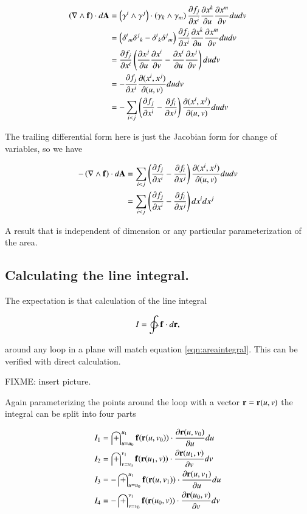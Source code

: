 \documentclass{article}
\newcommand{\grad}[0]{\nabla}
\newcommand{\PD}[2]{\frac{\partial {#2}}{\partial {#1}}}
\begin{document}
\begin{align*}
\left(\grad \wedge \Bf\right) \cdot d\BA
&= \left( \gamma^i \wedge \gamma^j \right) \cdot \left(\gamma_k \wedge \gamma_m \right) \PD{x^{i}}{f_j} \PD{u}{x^k} \PD{v}{x^m} du dv \\
&= \left( {\delta^i}_m {\delta^j}_k -{\delta^i}_k {\delta^j}_m \right) \PD{x^{i}}{f_j} \PD{u}{x^k} \PD{v}{x^m} du dv \\
&= \PD{x^{i}}{f_j} \left( \PD{u}{x^j} \PD{v}{x^i} -\PD{u}{x^i} \PD{v}{x^j} \right) du dv \\
&= -\PD{x^{i}}{f_j} \PD{(u,v)}{(x^i, x^j)} du dv \\
&= -\sum_{i<j} \left( \PD{x^{i}}{f_j} -\PD{x^{j}}{f_i} \right) \PD{(u,v)}{(x^i, x^j)} du dv \\
\end{align*}

The trailing differential form here is just the Jacobian form for change of variables, so we have

\begin{align}\label{eqn:areaintegral}
-\left(\grad \wedge \Bf\right) \cdot d\BA
&= \sum_{i<j} \left( \PD{x^{i}}{f_j} -\PD{x^{j}}{f_i} \right) \PD{(u,v)}{(x^i, x^j)} du dv \\
&= \sum_{i<j} \left( \PD{x^{i}}{f_j} -\PD{x^{j}}{f_i} \right) dx^i dx^j
\end{align}

A result that is independent of dimension or any particular parameterization of the area.

\subsection{ Calculating the line integral. }

The expectation is that calculation of the line integral

\begin{equation}
I = \ointctrclockwise \Bf \cdot d\Br,
\end{equation}

around any loop in a plane will match equation \ref{eqn:areaintegral}.  This can
be verified with direct calculation.

FIXME: insert picture.

Again parameterizing the points around the loop with a vector $\mathbf{r} = \mathbf{r}(u,v)$ the integral can be split into four parts

\begin{align*}
I_1 &=  \int_{u=u_0}^{u_1} \Bf(\Br(u,v_0)) \cdot \PD{u}{\Br(u,v_0)} du \\
I_2 &=  \int_{v=v_0}^{v_1} \Bf(\Br(u_1,v)) \cdot \PD{v}{\Br(u_1,v)} dv \\
I_3 &= -\int_{u=u_0}^{u_1} \Bf(\Br(u,v_1)) \cdot \PD{u}{\Br(u,v_1)} du \\
I_4 &= -\int_{v=v_0}^{v_1} \Bf(\Br(u_0,v)) \cdot \PD{v}{\Br(u_0,v)} dv \\
\end{align*}
\end{document}
